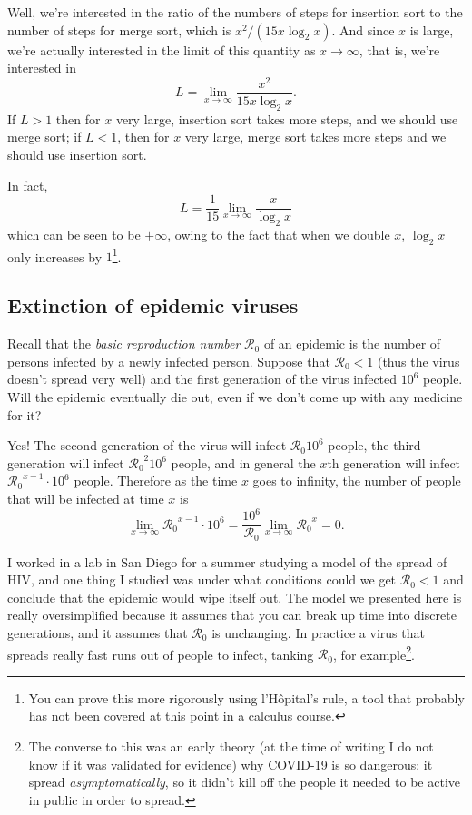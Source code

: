 \documentclass[reqno,12pt,letterpaper]{amsart}
\theoremstyle{definition}
\numberwithin{equation}{section}
\begin{document}
Well, we're interested in the ratio of the numbers of steps for insertion sort to the number of steps for merge sort, which is $x^2/(15x \log_2 x)$.
And since $x$ is large, we're actually interested in the limit of this quantity as $x \to \infty$, that is, we're interested in
$$L = \lim_{x \to \infty} \frac{x^2}{15x \log_2 x}.$$
If $L > 1$ then for $x$ very large, insertion sort takes more steps, and we should use merge sort; if $L < 1$, then for $x$ very large, merge sort takes more steps and we should use insertion sort.

In fact,
$$L = \frac{1}{15} \lim_{x \to \infty} \frac{x}{\log_2 x}$$
which can be seen to be $+\infty$, owing to the fact that when we double $x$, $\log_2 x$ only increases by $1$\footnote{You can prove this more rigorously using l'H\^opital's rule, a tool that probably has not been covered at this point in a calculus course.}.

\subsection{Extinction of epidemic viruses}
Recall that the \emph{basic reproduction number} $\mathcal R_0$ of an epidemic is the number of persons infected by a newly infected person.
Suppose that $\mathcal R_0 < 1$ (thus the virus doesn't spread very well) and the first generation of the virus infected $10^6$ people. Will the epidemic eventually die out, even if we don't come up with any medicine for it?

Yes! The second generation of the virus will infect $\mathcal R_0 10^6$ people, the third generation will infect ${\mathcal R_0}^2 10^6$ people, and in general the $x$th generation will infect ${\mathcal R_0}^{x - 1} \cdot 10^6$ people.
Therefore as the time $x$ goes to infinity, the number of people that will be infected at time $x$ is
$$\lim_{x \to \infty} {\mathcal R_0}^{x - 1} \cdot 10^6 = \frac{10^6}{\mathcal R_0} \lim_{x \to \infty} {\mathcal R_0}^x = 0.$$

I worked in a lab in San Diego for a summer studying a model of the spread of HIV, and one thing I studied was under what conditions could we get $\mathcal R_0 < 1$ and conclude that the epidemic would wipe itself out.
The model we presented here is really oversimplified because it assumes that you can break up time into discrete generations, and it assumes that $\mathcal R_0$ is unchanging.
In practice a virus that spreads really fast runs out of people to infect, tanking $\mathcal R_0$, for example\footnote{The converse to this was an early theory (at the time of writing I do not know if it was validated for evidence) why COVID-19 is so dangerous: it spread \emph{asymptomatically}, so it didn't kill off the people it needed to be active in public in order to spread.}.
\end{document}
